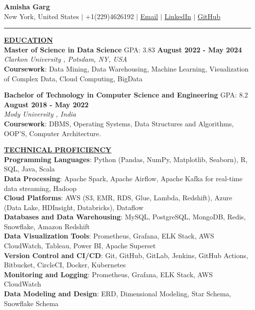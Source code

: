 \documentclass{article}
\begin{document}
\begin{center}
\thispagestyle{empty}
\large \textbf{Amisha Garg \\}
\normalsize New York, United States $\mid$ +1(229)4626192 $\mid$ \href{mailto:amishagarg828@gmail.com}{Email} $\mid$ \href{https://www.linkedin.com/in/your-linkedin}{LinkedIn} $\mid$ \href{https://github.com/your-github}{GitHub} \\
\rule{\textwidth}{1pt}
\end{center}

\noindent \textbf{\underline{EDUCATION}} \\
\textbf{Master of Science in Data Science} GPA: 3.83  \hfill \textbf{August 2022 - May 2024} \\
\textit{Clarkon University , Potsdam, NY, USA}\\
\textbf{Coursework}: Data Mining, Data Warehousing, Machine Learning, Visualization of Complex Data, Cloud Computing, BigData\\

\begin{itemize}[noitemsep,nolistsep,leftmargin=*]
\end{itemize}
\textbf{Bachelor of Technology in Computer Science and Engineering} GPA: 8.2 \hfill \textbf{August 2018 - May 2022} \\
\textit{Mody University , India} \\
\textbf{Coursework}: DBMS, Operating Systems, Data Structures and Algorithms, OOP'S, Computer Architecture.

\vspace{3mm}
\noindent \textbf{\underline{TECHNICAL PROFICIENCY}} \\
\textbf{Programming Languages}{: \small Python (Pandas, NumPy, Matplotlib, Seaborn), R, SQL, Java, Scala} \\
\textbf{Data Processing}{: \small Apache Spark, Apache Airflow, Apache Kafka for real-time data streaming, Hadoop} \\
\textbf{Cloud Platforms}{: \small AWS (S3, EMR, RDS, Glue, Lambda, Redshift), Azure (Data Lake, HDInsight, Databricks), Dataflow} \\
\textbf{Databases and Data Warehousing}{: \small MySQL, PostgreSQL, MongoDB, Redis, Snowflake, Amazon Redshift} \\
\textbf{Data Visualization Tools}{: \small Prometheus, Grafana, ELK Stack, AWS CloudWatch, Tableau, Power BI, Apache Superset} \\
\textbf{Version Control and CI/CD}{: \small Git, GitHub, GitLab, Jenkins, GitHub Actions, Bitbucket, CircleCI, Docker, Kubernetes } \\
\textbf{Monitoring and Logging}{: \small Prometheus, Grafana, ELK Stack, AWS CloudWatch} \\
\textbf{Data Modeling and Design}{: \small ERD, Dimensional Modeling, Star Schema, Snowflake Schema} 
\vspace{3mm}
\end{document}
